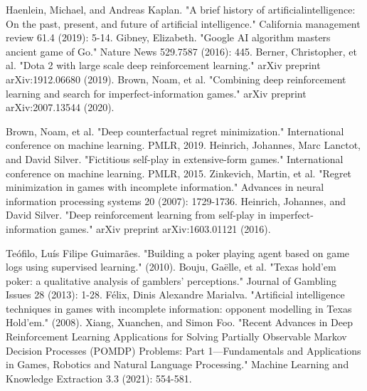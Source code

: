 \documentclass[12pt,oneside,a4paper]{report}
\begin{document}
\begin{thebibliography}{100}
    Haenlein, Michael, and Andreas Kaplan. "A brief history of artificialintelligence: On the past, present, and future of artificial intelligence." California management review 61.4 (2019): 5-14.
    Gibney, Elizabeth. "Google AI algorithm masters ancient game of Go." Nature News 529.7587 (2016): 445.
    Berner, Christopher, et al. "Dota 2 with large scale deep reinforcement learning." arXiv preprint arXiv:1912.06680 (2019).
    Brown, Noam, et al. "Combining deep reinforcement learning and search for imperfect-information games." arXiv preprint arXiv:2007.13544 (2020).

    Brown, Noam, et al. "Deep counterfactual regret minimization." International conference on machine learning. PMLR, 2019. 
    Heinrich, Johannes, Marc Lanctot, and David Silver. "Fictitious self-play in extensive-form games." International conference on machine learning. PMLR, 2015.
    Zinkevich, Martin, et al. "Regret minimization in games with incomplete information." Advances in neural information processing systems 20 (2007): 1729-1736.
    Heinrich, Johannes, and David Silver. "Deep reinforcement learning from self-play in imperfect-information games." arXiv preprint arXiv:1603.01121 (2016).

    Teófilo, Luís Filipe Guimarães. "Building a poker playing agent based on game logs using supervised learning." (2010).
    Bouju, Gaëlle, et al. "Texas hold'em poker: a qualitative analysis of gamblers' perceptions." Journal of Gambling Issues 28 (2013): 1-28.
    Félix, Dinis Alexandre Marialva. "Artificial intelligence techniques in games with incomplete information: opponent modelling in Texas Hold'em." (2008).
    Xiang, Xuanchen, and Simon Foo. "Recent Advances in Deep Reinforcement Learning Applications for Solving Partially Observable Markov Decision Processes (POMDP) Problems: Part 1—Fundamentals and Applications in Games, Robotics and Natural Language Processing." Machine Learning and Knowledge Extraction 3.3 (2021): 554-581.


\end{thebibliography}
\end{document}

